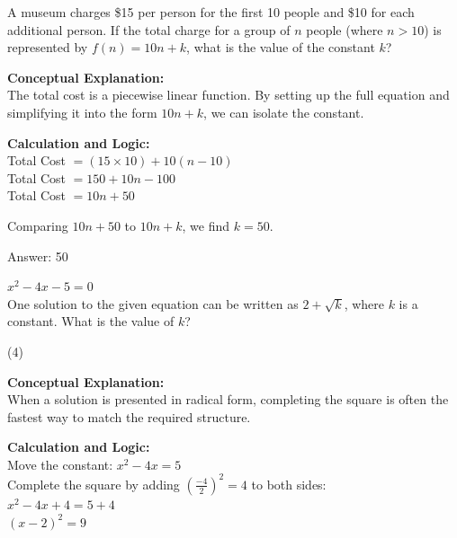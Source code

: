 \documentclass[11pt,paper=a4,answers]{exam}
\begin{document}
\begin{questions}
\vspace{40pt}

\question
A museum charges \$15 per person for the first 10 people and \$10 for each additional person. If the total charge for a group of $n$ people (where $n > 10$) is represented by $f(n) = 10n + k$, what is the value of the constant $k$?

\begin{solution}
\textbf{Conceptual Explanation:} \\
The total cost is a piecewise linear function. By setting up the full equation and simplifying it into the form $10n + k$, we can isolate the constant.

\vspace{20pt}

\textbf{Calculation and Logic:} \\
Total Cost $= (15 \times 10) + 10(n - 10)$ \\
Total Cost $= 150 + 10n - 100$ \\
Total Cost $= 10n + 50$

\vspace{10pt}

Comparing $10n + 50$ to $10n + k$, we find $k = 50$.

\vspace{25pt}

Answer: \colorbox{yellow!100}{50}
\end{solution}

\vspace{40pt}

\question
$x^2 - 4x - 5 = 0$ \\
One solution to the given equation can be written as $2 + \sqrt{k}$, where $k$ is a constant. What is the value of $k$?
\begin{tasks}(4)
\end{tasks}

\begin{solution}
\textbf{Conceptual Explanation:} \\
When a solution is presented in radical form, completing the square is often the fastest way to match the required structure.

\vspace{20pt}

\textbf{Calculation and Logic:} \\
Move the constant: $x^2 - 4x = 5$ \\
Complete the square by adding $(\frac{-4}{2})^2 = 4$ to both sides: \\
$x^2 - 4x + 4 = 5 + 4$ \\
$(x - 2)^2 = 9$


\end{solution}
\end{questions}
\end{document}
